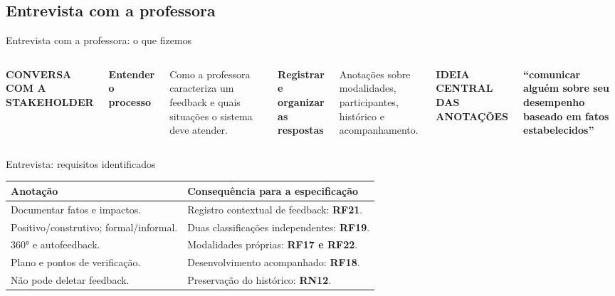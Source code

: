 \documentclass[aspectratio=169,t,xcolor=table]{beamer}
\newcommand{\head}[1]{\textcolor{UFGBlue}{\textbf{#1}}}
\newcommand{\kicker}[1]{{\footnotesize\bfseries\color{UFGBlue}#1\par}\vspace{.18cm}}
\begin{document}
\subsection{Entrevista com a professora}
\begin{frame}{Entrevista com a professora: o que fizemos}

\begin{columns}[T,onlytextwidth]
\kicker{CONVERSA COM A STAKEHOLDER}
\textbf{Entender o processo}\par
Como a professora caracteriza um feedback e quais situações o sistema deve atender.\par
\vspace{.25cm}
\textbf{Registrar e organizar as respostas}\par
Anotações sobre modalidades, participantes, histórico e acompanhamento.
\kicker{IDEIA CENTRAL DAS ANOTAÇÕES}
{\fontsize{20}{25}\selectfont\bfseries\color{Navy}``comunicar alguém sobre seu desempenho baseado em fatos estabelecidos''\par}
\end{columns}

\end{frame}

\begin{frame}{Entrevista: requisitos identificados}

\small
\begin{tabularx}{\textwidth}{@{}L{.44\textwidth}Y@{}}
\toprule\head{Anotação} & \head{Consequência para a especificação}\\\midrule
Documentar fatos e impactos. & Registro contextual de feedback: \textbf{RF21}.\\[.12cm]
Positivo/construtivo; formal/informal. & Duas classificações independentes: \textbf{RF19}.\\[.12cm]
360° e autofeedback. & Modalidades próprias: \textbf{RF17 e RF22}.\\[.12cm]
Plano e pontos de verificação. & Desenvolvimento acompanhado: \textbf{RF18}.\\[.12cm]
Não pode deletar feedback. & Preservação do histórico: \textbf{RN12}.\\\bottomrule
\end{tabularx}\par

\end{frame}
\end{document}

